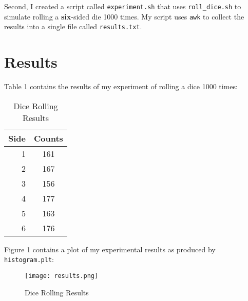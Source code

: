 \documentclass[letterpaper]{article}
\begin{document}
Second, I created a script called {\tt experiment.sh} that uses {\tt roll\_dice.sh} to simulate rolling a {\bf six}-sided die 1000 times. My script uses {\tt awk} to collect the results into a single file called {\tt results.txt}.


\section*{Results}

Table 1 contains the results of my experiment of rolling a dice 1000 times:

\begin{table}[h!]
    \centering
    \begin{tabular}{r||c}
    Side	& Counts\\
    \hline
    1	& 161\\
    2	& 167\\
    3	& 156\\
    4	& 177\\
    5	& 163\\
    6	& 176\\
    \end{tabular}
    \caption{Dice Rolling Results}
    \label{tbl:dice}
\end{table}

Figure 1 contains a plot of my experimental results as produced by {\tt histogram.plt}:

\begin{figure}[h!]
  \centering
  \texttt{[image: results.png]}
  \caption{Dice Rolling Results}
  \label{fig:results}
\end{figure}
\end{document}
